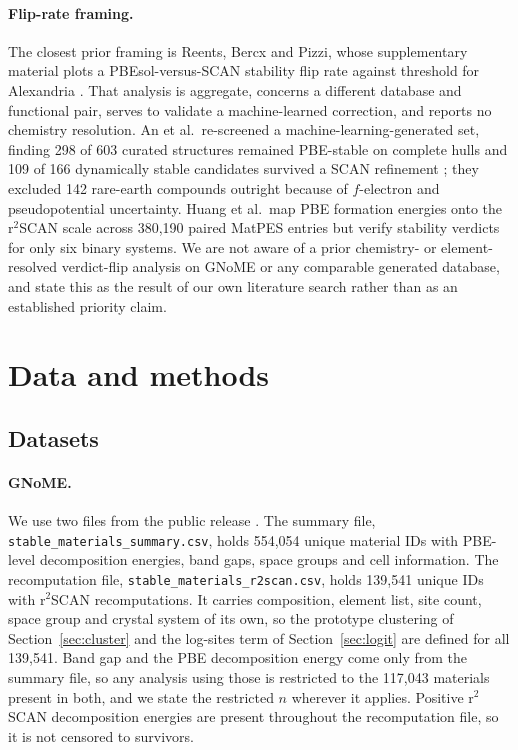 \documentclass[11pt]{article}
\begin{document}
\paragraph{Flip-rate framing.}
The closest prior framing is Reents, Bercx and Pizzi, whose supplementary material plots a
PBEsol-versus-SCAN stability flip rate against threshold for Alexandria
\citep{reents2026}. That analysis is aggregate, concerns a different database and
functional pair, serves to validate a machine-learned correction, and reports no
chemistry resolution. An et al.\ re-screened a machine-learning-generated set, finding 298 of 603
curated structures remained PBE-stable on complete hulls and 109 of 166 dynamically
stable candidates survived a SCAN refinement \citep{an2026}; they excluded 142 rare-earth
compounds outright because of $f$-electron and pseudopotential uncertainty. Huang et al.\
map PBE formation energies onto the r$^2$SCAN scale across 380{,}190 paired MatPES
entries \citep{huang2026,kaplan2025} but verify stability verdicts for only six binary
systems. We are not aware of a prior chemistry- or element-resolved verdict-flip analysis
on GNoME or any comparable generated database, and state this as the result of our own
literature search rather than as an established priority claim.

\section{Data and methods}

\subsection{Datasets}\label{sec:datasets}

\paragraph{GNoME.} We use two files from the public release \citep{merchant2023}. The summary
file, \texttt{stable\_materials\_summary.csv}, holds 554{,}054 unique material IDs with
PBE-level decomposition energies, band gaps, space groups and cell information. The
recomputation file, \texttt{stable\_materials\_r2scan.csv}, holds 139{,}541 unique IDs
with r$^2$SCAN recomputations. It carries composition, element list, site count, space
group and crystal system of its own, so the prototype clustering of
Section~\ref{sec:cluster} and the log-sites term of Section~\ref{sec:logit} are defined
for all 139{,}541. Band gap and the PBE decomposition energy come only from the summary
file, so any analysis using those is restricted to the 117{,}043 materials present in
both, and we state the restricted $n$ wherever it applies. Positive r$^2$SCAN
decomposition energies are present throughout the recomputation file, so it is not
censored to survivors.
\end{document}
